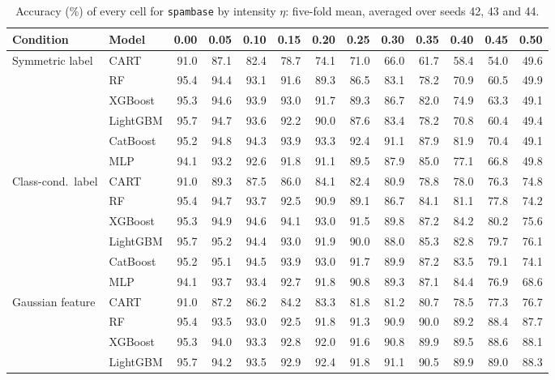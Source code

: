 \documentclass[pdflatex,sn-mathphys]{sn-jnl}
\theoremstyle{thmstyleone}
\begin{document}
\begin{table}[htbp]
\centering
\tiny
\setlength{\tabcolsep}{2.6pt}
\caption{Accuracy (\%) of every cell for \texttt{spambase} by intensity $\eta$: five-fold mean, averaged over seeds 42, 43 and 44.}
\label{tab:grid_spambase}
\begin{tabular}{@{}llrrrrrrrrrrr@{}}
\toprule
Condition & Model & 0.00 & 0.05 & 0.10 & 0.15 & 0.20 & 0.25 & 0.30 & 0.35 & 0.40 & 0.45 & 0.50 \\
\midrule
Symmetric label & CART & 91.0 & 87.1 & 82.4 & 78.7 & 74.1 & 71.0 & 66.0 & 61.7 & 58.4 & 54.0 & 49.6 \\
 & RF & 95.4 & 94.4 & 93.1 & 91.6 & 89.3 & 86.5 & 83.1 & 78.2 & 70.9 & 60.5 & 49.9 \\
 & XGBoost & 95.3 & 94.6 & 93.9 & 93.0 & 91.7 & 89.3 & 86.7 & 82.0 & 74.9 & 63.3 & 49.1 \\
 & LightGBM & 95.7 & 94.7 & 93.6 & 92.2 & 90.0 & 87.6 & 83.4 & 78.2 & 70.8 & 60.4 & 49.4 \\
 & CatBoost & 95.2 & 94.8 & 94.3 & 93.9 & 93.3 & 92.4 & 91.1 & 87.9 & 81.9 & 70.4 & 49.1 \\
 & MLP & 94.1 & 93.2 & 92.6 & 91.8 & 91.1 & 89.5 & 87.9 & 85.0 & 77.1 & 66.8 & 49.8 \\
\midrule
Class-cond.\ label & CART & 91.0 & 89.3 & 87.5 & 86.0 & 84.1 & 82.4 & 80.9 & 78.8 & 78.0 & 76.3 & 74.8 \\
 & RF & 95.4 & 94.7 & 93.7 & 92.5 & 90.9 & 89.1 & 86.7 & 84.1 & 81.1 & 77.8 & 74.2 \\
 & XGBoost & 95.3 & 94.9 & 94.6 & 94.1 & 93.0 & 91.5 & 89.8 & 87.2 & 84.2 & 80.2 & 75.6 \\
 & LightGBM & 95.7 & 95.2 & 94.4 & 93.0 & 91.9 & 90.0 & 88.0 & 85.3 & 82.8 & 79.7 & 76.1 \\
 & CatBoost & 95.2 & 95.1 & 94.5 & 93.9 & 93.0 & 91.7 & 89.9 & 87.2 & 83.5 & 79.1 & 74.1 \\
 & MLP & 94.1 & 93.7 & 93.4 & 92.7 & 91.8 & 90.8 & 89.3 & 87.1 & 84.4 & 76.9 & 68.6 \\
\midrule
Gaussian feature & CART & 91.0 & 87.2 & 86.2 & 84.2 & 83.3 & 81.8 & 81.2 & 80.7 & 78.5 & 77.3 & 76.7 \\
 & RF & 95.4 & 93.5 & 93.0 & 92.5 & 91.8 & 91.3 & 90.9 & 90.0 & 89.2 & 88.4 & 87.7 \\
 & XGBoost & 95.3 & 94.0 & 93.3 & 92.8 & 92.0 & 91.6 & 90.8 & 89.9 & 89.5 & 88.6 & 88.1 \\
 & LightGBM & 95.7 & 94.2 & 93.5 & 92.9 & 92.4 & 91.8 & 91.1 & 90.5 & 89.9 & 89.0 & 88.3 \\

\end{tabular}
\end{table}
\end{document}

